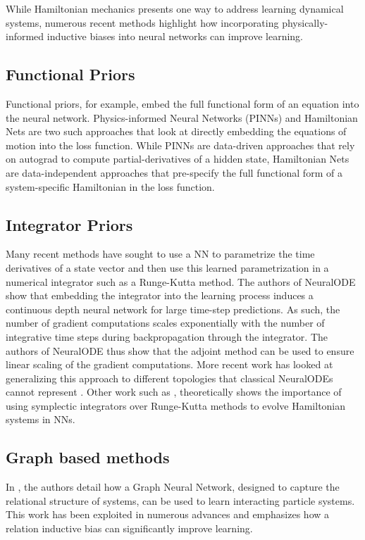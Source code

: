 \documentclass{article}
\begin{document}
While Hamiltonian mechanics presents one way to address learning dynamical systems, numerous recent methods highlight how incorporating physically-informed inductive biases into neural networks can improve learning.

\subsection*{Functional Priors}
Functional priors, for example, embed the full functional form of an equation into the neural network. Physics-informed Neural Networks (PINNs) \cite{raissi_physics_2017,raissi_physics-informed_2019} and Hamiltonian Nets \cite{mattheakis_hamiltonian_2020} are two such approaches that look at directly embedding the equations of motion into the loss function. While PINNs are data-driven approaches that rely on autograd to compute partial-derivatives of a hidden state, Hamiltonian Nets are data-independent approaches that pre-specify the full functional form of a system-specific Hamiltonian in the loss function.

\subsection*{Integrator Priors}
Many recent methods have sought to use a NN to parametrize the time derivatives of a state vector and then use this learned parametrization in a numerical integrator such as a Runge-Kutta method. The authors of NeuralODE \cite{chen_neural_2018} show that embedding the integrator into the learning process induces a continuous depth neural network for large time-step predictions. As such, the number of gradient computations scales exponentially with the number of integrative time steps during backpropagation through the integrator. The authors of NeuralODE thus show that the adjoint method can be used to ensure linear scaling of the gradient computations. More recent work has looked at generalizing this approach to different topologies that classical NeuralODEs cannot represent \cite{dupont_augmented_2019}. Other work such as \cite{zhu_deep_2020}, theoretically shows the importance of using symplectic integrators over Runge-Kutta methods to evolve Hamiltonian systems in NNs.

\subsection*{Graph based methods}
In \cite{battaglia_interaction_2016}, the authors detail how a Graph Neural Network, designed to capture the relational structure of systems, can be used to learn interacting particle systems. This work has been exploited in numerous advances \cite{sanchez-gonzalez_graph_2018,sanchez-gonzalez_learning_2020,cranmer_lagrangian_2020} and emphasizes how a relation inductive bias can significantly improve learning.
\end{document}
